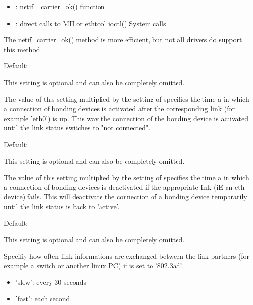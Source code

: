 \begin{description}
\begin{itemize}
    \item {}: netif \_carrier\_ok() function 
    \item {}: direct calls to MII or ethtool ioctl() System calls
  
  \end{itemize}
  
  The netif\_carrier\_ok() method is more efficient, but not all 
  drivers do support this method.


  Default: 

  This setting is optional and can also be completely omitted.

  The value of this setting multiplied by the setting of 
   specifies the time a in which a
  connection of bonding devices is activated after the corresponding 
  link (for example 'eth0') is up. This way the connection of the
  bonding device is activated until the link status switches to 
  "not connected".
  

  Default: 

  This setting is optional and can also be completely omitted.

  The value of this setting multiplied by the setting of
   specifies the time a in which a
  connection of bonding devices is deactivated if the appropriate
  link (iE an eth-device) fails. This will deactivate the connection
  of a bonding device temporarily until the link status is back to 'active'.
  

  Default: 

  This setting is optional and can also be completely omitted.

  Specifiy how often link informations are exchanged between the 
  link partners (for example a switch or another linux PC) if 
   is set to '802.3ad'.
  
  \begin{itemize}

    \item 'slow': every 30 seconds 
    \item 'fast': each second.
    

\end{itemize}
\end{description}
